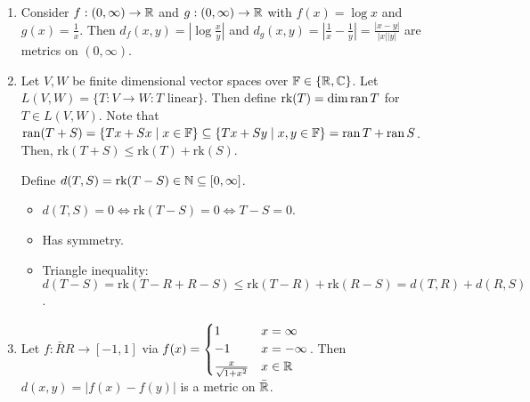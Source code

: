 \documentclass{report}
\begin{document}
{\begin{enumerate}
    \item Consider $f:(0, \infty) \to \RR$ and $g: (0, \infty) \to \RR$ with $f(x) = \log x$ and $g(x) = \frac 1x$. Then $d_f(x, y) = \left| \log \frac xy \right|$ and $d_g(x, y) = \left| \frac 1x - \frac 1y \right| = \frac{|x - y|}{|x||y|}$ are metrics on $(0, \infty)$.
    \item Let $V,W$ be finite dimensional vector spaces over $\FF \in \{ \RR, \CC\}$. Let $L(V, W) = \{T: V \to W: T \text{ linear}\}$. Then define $\text{rk}(T) = \dim \operatorname{ran} T$ for $T \in L(V, W)$. Note that $\ran (T + S) = \{Tx + Sx \mid  x \in \FF\} \subseteq \{Tx + Sy \mid x, y \in \FF\} = \ran T + \ran S$. Then, $\text{rk}(T + S) \leq \text{rk}(T) + \text{rk}(S)$.
    
    Define $d(T, S)  = \text{rk}(T-S) \in \NN \subseteq [0, \infty]$. 
    \begin{itemize}
        \item $d(T, S) = 0 \iff \text{rk}(T-S) = 0 \iff T -S = 0$.
        \item Has symmetry.
        \item Triangle inequality: $d(T-S) = \text{rk}(T - R + R - S) \leq \text{rk}(T - R) + \text{rk}(R - S) = d(T, R) + d(R, S)$.
    \end{itemize}
    \item Let $f: \bar RR \to [-1, 1]$ via $f(x) = \begin{cases} 1 & x = \infty \\ -1 & x = -\infty \\ \frac{x}{\sqrt{1 + x^2}} & x \in \RR \end{cases}$. Then $d(x, y) = |f(x) - f(y)|$ is a metric on $\bar \RR$.
\end{enumerate}}

\end{document}
